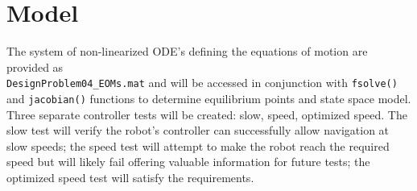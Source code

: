 \documentclass[12pt]{article}
\begin{document}
\section{Model} \label{sec:2}
The system of non-linearized ODE's defining the equations of motion are provided as\\ \lstinline{DesignProblem04_EOMs.mat} and will be accessed in conjunction with \lstinline{fsolve()} and \lstinline{jacobian()} functions to determine equilibrium points and state space model.  Three separate controller tests will be created: slow, speed, optimized speed.  The slow test will verify the robot's controller can successfully allow navigation at slow speeds; the speed test will attempt to make the robot reach the required speed but will likely fail offering valuable information for future tests; the optimized speed test will satisfy the requirements.
\end{document}
